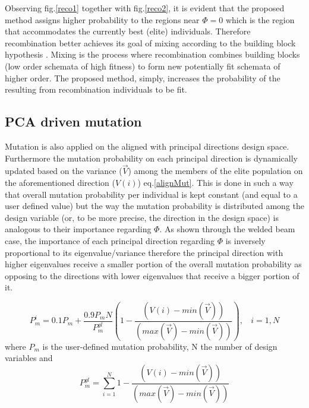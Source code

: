 Observing fig.\ref{reco1} together with fig.\ref{reco2}, it is evident that the proposed method assigns higher probability to the regions near $\Phi=0$ which is the region that accommodates the currently best (elite) individuals. Therefore recombination better achieves its goal of mixing according to the building block hypothesis \cite{Gold89}. Mixing is the process where recombination combines building blocks (low order schemata of high fitness) to form new potentially fit schemata of higher order. The proposed method, simply, increases the probability of the resulting from recombination individuals to be fit.   



\subsection{PCA driven mutation}
Mutation is also applied on the aligned with principal directions design space. Furthermore the mutation probability on each principal direction is dynamically updated based on the variance ($\vec{V}$) among the members of the elite population on the aforementioned direction ($V(i)$) eq.\ref{alignMut}. This is done in such a way that overall mutation probability per individual is kept constant (and equal to a user defined value) but the way the mutation probability is distributed among the design variable (or, to be more precise, the direction in the design space) is analogous to their importance regarding $\Phi$. As shown through the welded beam case, the importance of each principal direction regarding $\Phi$ is inversely proportional to its eigenvalue/variance therefore the principal direction with higher eigenvalues receive a smaller portion of the overall mutation probability as opposing to the directions with lower eigenvalues that receive a bigger portion of it.        

\begin{equation} 
   P_m^{i}=0.1 P_m + \frac{0.9 P_m N}{P_m^{gl}} (1-\frac{(V(i)-min(\vec{V}))}{(max(\vec{V})-min(\vec{V}))}),~~~~i=1,N 
   \label{alignMut} %
\end{equation}
where $P_m$ is the user-defined mutation probability, N the number of design variables and 
\begin{equation} 
   P_m^{gl}=\sum^{N}_{i=1} 1-\frac{(V(i)-min(\vec{V}))}{(max(\vec{V})-min(\vec{V}))}
   \label{alignMut2} %
\end{equation}


